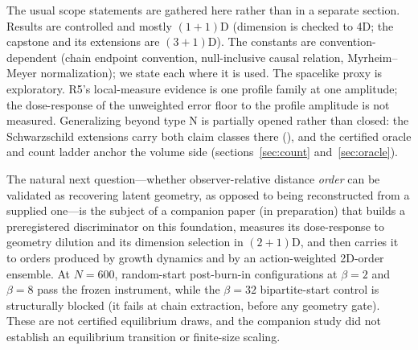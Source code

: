 The usual scope statements are gathered here rather than in a separate
section. Results are controlled and mostly $(1{+}1)$D (dimension is checked
to 4D; the capstone and its extensions are $(3{+}1)$D). The constants are
convention-dependent (chain endpoint convention, null-inclusive causal
relation, Myrheim--Meyer normalization); we state each where it is used. The
spacelike proxy is exploratory. R5's local-measure evidence is one profile
family at one amplitude; the dose-response of the unweighted error floor to
the profile amplitude is not measured. Generalizing beyond type N is
partially opened rather than closed: the Schwarzschild extensions carry both
claim classes there (), and the certified oracle and
count ladder anchor the volume side (sections~\ref{sec:count}
and~\ref{sec:oracle}).

The natural next question---whether observer-relative distance \emph{order}
can be validated as recovering latent geometry, as opposed to being
reconstructed from a supplied one---is the subject of a companion paper (in
preparation) that builds a preregistered discriminator on this foundation,
measures its dose-response to geometry dilution and its dimension selection
in $(2{+}1)$D, and then carries it to orders produced by growth dynamics and
by an action-weighted 2D-order ensemble. At $N = 600$, random-start
post-burn-in configurations at $\beta = 2$ and $\beta = 8$ pass the frozen
instrument, while the $\beta = 32$ bipartite-start control is structurally
blocked (it fails at chain extraction, before any geometry gate). These are
not certified equilibrium draws, and the companion study did not establish
an equilibrium transition or finite-size scaling.
